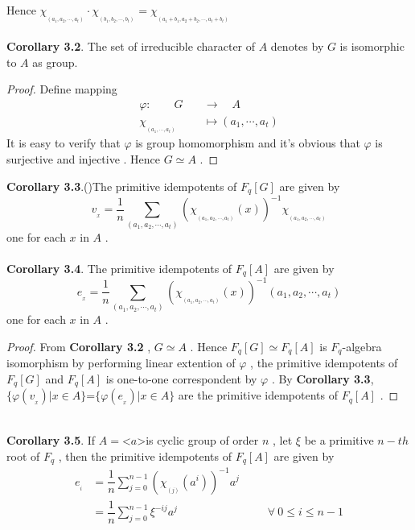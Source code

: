 \documentclass{article}
\begin{document}
Hence $\chi_{_{(a_1,a_2,\cdots,a_t)}}\cdot\chi_{_{(b_1,b_2,\cdots,b_t)}}=\chi_{_{(a_1+b_1,a_2+b_2,\cdots,a_t+b_t)}}$\\
\quad\\
\textbf{Corollary 3.2}. The set of irreducible character of $A$ denotes by $G$ is isomorphic to $A$ as group.
\begin{proof}
Define mapping
    \begin{align*}
        \varphi:\quad\quad G\quad &\longrightarrow\quad A\\
        \chi_{_{(a_1,\cdots,a_t)}}&\longmapsto(a_1,\cdots,a_t)
    \end{align*}
It is easy to verify that $\varphi$ is group homomorphism and it's obvious that $\varphi$ is surjective and injective . Hence $G\simeq A$ . 
\end{proof}
\textbf{Corollary 3.3}.(\cite{bib4})The  primitive idempotents of $F_q[G]$ are given by 
\begin{equation}
    v_{_x}=\dfrac{1}{n}\sum_{(a_1,a_2,\cdots,a_t)}(\chi_{_{(a_1,a_2,\cdots,a_t)}}(x))^{\scriptscriptstyle-1}\chi_{_{(a_1,a_2,\cdots,a_t)}}
\end{equation}
one for each $x$ in $A$ .\\
\quad\\
\textbf{Corollary 3.4}. The  primitive idempotents of $F_q[A]$ are given by
\begin{equation}
    e_{_x}=\dfrac{1}{n}\sum_{(a_1,a_2,\cdots,a_t)}(\chi_{_{(a_1,a_2,\cdots,a_t)}}(x))^{\scriptscriptstyle-1}(a_1,a_2,\cdots,a_t)
\end{equation}
one for each $x$ in $A$ .
\begin{proof}
    From \textbf{Corollary 3.2} , $G\simeq A$ . Hence $F_q[G]\simeq F_q[A]$ is $F_q$-algebra isomorphism by performing linear extention of $\varphi$ , the primitive idempotents of $F_q[G]$ and $ F_q[A]$ is one-to-one correspondent by $\varphi$ . By \textbf{Corollary 3.3}, $\{\varphi(v_{_x})|x\in{A}\}$=$\{\varphi(e_{_x})|x\in{A}\}$ are the primitive idempotents of $F_q[A]$ .
\end{proof}
\quad\\
\textbf{Corollary 3.5}. If $A=$\textless $a$\textgreater is cyclic group of order $n$ , let $\xi$ be a primitive $n-th$ root of $F_q$ , then the primitive idempotents of $F_q[A]$ are given by
\begin{align}
    e_{_i}&=\dfrac{1}{n}\sum_{j=0}^{n-1}(\chi_{_{(j)}}(a^{\scriptscriptstyle i}))^{\scriptscriptstyle-1}a^{j}\\
    &=\dfrac{1}{n}\sum_{j=0}^{n-1}\xi^{\scriptscriptstyle-ij}a^{j}\qquad\qquad\qquad\qquad\forall\ 0\leq i\leq n-1
\end{align}
\end{document}
